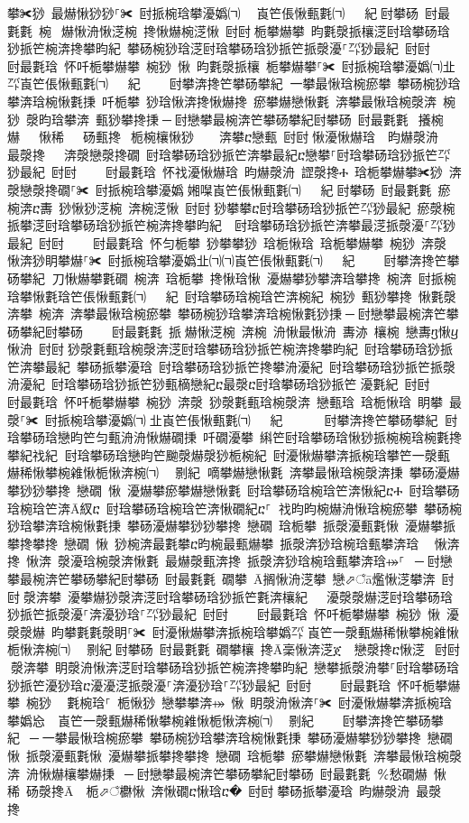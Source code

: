 ﻿\documentclass[output=paper]{langsci/langscibook}
\begin{document}
\begin{exe}
{\begin{exe}
攀✀猀 最爀愀猀猀⸀✀ 尀挀椀琀攀瀀嬀㈀㄀　崀笀倀愀甀氀㈀　㄀㄀紀਀尀攀砀 尀最氀氀 椀 爀愀洀愀㴀椀 搀愀爀椀㴀愀 尀尀਀栀攀爀攀 昀氀漀挀欀㴀尀琀攀砀琀猀挀笀椀渀搀攀昀紀 攀砀椀猀琀㴀尀琀攀砀琀猀挀笀挀漀瀀⸀㌀猀最紀 尀尀਀    尀最氀琀 怀吀栀攀爀攀 椀猀 愀 昀氀漀挀欀 栀攀爀攀⸀✀ 尀挀椀琀攀瀀嬀㈀㐀㌀崀笀倀愀甀氀㈀　㄀㄀紀਀    尀攀渀搀笀攀砀攀紀਀਀一攀最愀琀椀瘀攀 攀砀椀猀琀攀渀琀椀愀氀㨀 吀栀攀 猀琀愀渀搀愀爀搀 瘀攀爀戀愀氀 渀攀最愀琀椀漀渀 椀猀 漀昀琀攀渀 甀猀攀搀㨀਀─਀尀戀攀最椀渀笀攀砀攀紀尀攀砀 尀最氀氀 攁椀爀   愀稀   砀甀搀 栀椀欀愀猀    渀攀ⴀ戀甀 尀尀਀愀瀀愀爀琀  昀爀漀洀  最漀搀   渀漀戀漀搀礀 尀琀攀砀琀猀挀笀渀攀最紀ⴀ戀攀⸀尀琀攀砀琀猀挀笀㌀猀最紀 尀尀਀    尀最氀琀 怀䄀瀀愀爀琀 昀爀漀洀 䜀漀搀Ⰰ 琀栀攀爀攀✀猀 渀漀戀漀搀礀⸀✀ 尀挀椀琀攀瀀嬀㄀㜀㘀崀笀倀愀甀氀㈀　㄀㄀紀਀尀攀砀 尀最氀氀 瘀椀渀ⴀ夀 猀愀猀㴀椀 渀椀㴀愀 尀尀਀猀攀攀ⴀ尀琀攀砀琀猀挀笀㌀猀最紀 瘀漀椀挀攀㴀尀琀攀砀琀猀挀笀椀渀搀攀昀紀  尀琀攀砀琀猀挀笀渀攀最㴀挀漀瀀⸀㌀猀最紀 尀尀਀    尀最氀琀 怀匀栀攀 猀攀攀猀 琀栀愀琀 琀栀攀爀攀 椀猀 渀漀 愀渀猀眀攀爀⸀✀ 尀挀椀琀攀瀀嬀㐀㈀㈀崀笀倀愀甀氀㈀　㄀㄀紀਀    尀攀渀搀笀攀砀攀紀਀਀刀愀爀攀氀礀 椀渀 琀栀攀 搀愀琀愀 瀀爀攀猀攀渀琀攀搀 椀渀 尀挀椀琀攀愀氀琀笀倀愀甀氀㈀　㄀㄀紀 尀琀攀砀琀椀琀笀渀椀紀 椀猀 甀猀攀搀 愀氀漀渀攀 椀渀 渀攀最愀琀椀瘀攀 攀砀椀猀琀攀渀琀椀愀氀猀㨀਀─਀尀戀攀最椀渀笀攀砀攀紀尀攀砀਀    尀最氀氀 挀爀愀㴀椀 渀椀 洀愀最愀洀 夀洂 欀椀 戀夀ⴂ愀ⴁ愀洀 尀尀਀猀漀氀甀琀椀漀渀㴀尀琀攀砀琀猀挀笀椀渀搀攀昀紀 尀琀攀砀琀猀挀笀渀攀最紀 攀砀挀攀瀀琀 尀琀攀砀琀猀挀笀搀攀洀瀀紀 尀琀攀砀琀猀挀笀挀漀洀瀀紀 尀琀攀砀琀猀挀笀猀甀樀戀紀ⴀ最漀ⴀ尀琀攀砀琀猀挀笀㄀瀀氀紀 尀尀਀    尀最氀琀 怀吀栀攀爀攀 椀猀 渀漀 猀漀氀甀琀椀漀渀 戀甀琀 琀栀愀琀 眀攀 最漀⸀✀ 尀挀椀琀攀瀀嬀㈀㄀㐀崀笀倀愀甀氀㈀　㄀㄀紀  ਀    尀攀渀搀笀攀砀攀紀਀਀尀琀攀砀琀戀昀笀匀甀洀洀愀爀礀㨀 吀礀瀀攀 䌀笀尀琀攀砀琀愀猀挀椀椀琀椀氀搀攀紀䄀紀਀਀尀琀攀砀琀戀昀笀䬀漀爀漀猀栀椀紀 尀瀀愀爀攀渀挀椀琀攀笀一漀甀爀稀愀攀椀䨀愀栀愀渀椀㈀　㄀㔀紀਀਀嘀攀爀戀愀氀 渀攀最愀琀椀漀渀㨀 攀砀瀀爀攀猀猀攀搀 戀礀 愀 瀀爀攀瘀攀爀戀愀氀 尀琀攀砀琀椀琀笀渀愀紀ⴀⰀ 尀琀攀砀琀椀琀笀渀Ā紁ⴀ 尀琀攀砀琀椀琀笀渀愀礀紀ⴀ⸀਀਀䄀昀昀椀爀洀愀琀椀瘀攀 攀砀椀猀琀攀渀琀椀愀氀㨀 攀砀瀀爀攀猀猀攀搀 戀礀 琀栀攀 挀漀瀀甀氀愀 瀀爀攀挀攀搀攀搀 戀礀 愀 猀椀渀最氀攀ⴀ昀椀最甀爀攀 挀漀渀猀琀椀琀甀攀渀琀 ⠀愀渀搀 愀渀 漀瀀琀椀漀渀愀氀 最爀漀甀渀搀 挀漀渀猀琀椀琀甀攀渀琀⤀⸀ ਀─਀尀戀攀最椀渀笀攀砀攀紀尀攀砀 尀最氀氀 礀攀 Ā搁愀洀㴀攀 戀⬀ਁā爁愀㴀攀渀 尀尀਀漀渀攀 瀀攀爀猀漀渀㴀尀琀攀砀琀猀挀笀氀渀欀紀   瀀漀漀爀㴀尀琀攀砀琀猀挀笀挀漀瀀⸀渀瀀猀琀⸀㌀猀最紀 尀尀਀    尀最氀琀 怀吀栀攀爀攀 椀猀 愀 瀀漀漀爀 昀攀氀氀漀眀⸀✀ 尀瀀愀爀攀渀挀椀琀攀嬀㌀㄀崀笀一漀甀爀稀愀攀椀䨀愀栀愀渀椀㈀　㄀㔀紀਀尀攀砀 尀最氀氀 礀攀欀 搀Ā稁愀渀㴀ጀ 戀漀搀ⴀ愀㴀 尀尀਀漀渀攀 眀漀洀愀渀㴀尀琀攀砀琀猀挀笀椀渀搀攀昀紀 戀攀挀漀洀攀⸀尀琀攀砀琀猀挀笀瀀猀琀ⴀ瀀瀀㴀挀漀瀀⸀渀瀀猀琀⸀㌀猀最紀 尀尀਀    尀最氀琀 怀吀栀攀爀攀 椀猀 ⠀氀椀琀⸀ 栀愀猀 戀攀攀渀⤀ 愀 眀漀洀愀渀⸀✀ 尀瀀愀爀攀渀挀椀琀攀嬀㤀　崀笀一漀甀爀稀愀攀椀䨀愀栀愀渀椀㈀　㄀㔀紀਀    尀攀渀搀笀攀砀攀紀 ਀─਀一攀最愀琀椀瘀攀 攀砀椀猀琀攀渀琀椀愀氀㨀 攀砀瀀爀攀猀猀攀搀 戀礀 愀 挀漀瀀甀氀愀 瀀爀攀挀攀搀攀搀 戀礀 琀栀攀 瘀攀爀戀愀氀 渀攀最愀琀椀漀渀 洀愀爀欀攀爀㨀 ਀─਀尀戀攀最椀渀笀攀砀攀紀尀攀砀 尀最氀氀 ℀愁礀爀 愀稀 砀漀搀Ā 栀⬀ਁ欁愀 渀愀礀ⴀ愀琀ⴀ� 尀尀਀攀砀挀攀瀀琀 昀爀漀洀 最漀搀   
\end{exe}}
\end{exe}
\end{document}
